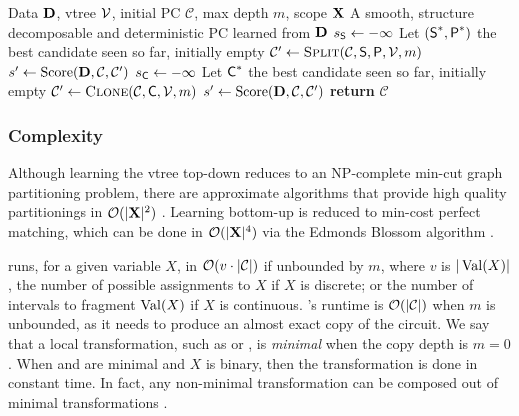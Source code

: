 \begin{algorithm}[t]
  \caption{}\label{alg:learnpsdd}
  \begin{algorithmic}[1]
    \Require Data $\mathbf{D}$, vtree $\operatorname{\mathcal{V}}$, initial PC $\mathcal{C}$, max depth $m$, scope $\mathbf{X}$
    \Ensure A smooth, structure decomposable and deterministic PC learned from $\mathbf{D}$
      \State $s_{\operatorname{\textsf{S}}}\gets -\infty$
      \State Let $(\operatorname{\textsf{S}}^\ast,\operatorname{\textsf{P}}^\ast)$ the best  candidate seen so far, initially empty
        \State $\mathcal{C}'\gets\textproc{Split}(\mathcal{C},\Sum,\Prod,\vtree,m)$
        \State $s'\gets\operatorname{\normalfont{Score}}(\mathbf{D},\mathcal{C},\mathcal{C}')$
      \EndFor
      \State $s_{\operatorname{\textsf{C}}}\gets -\infty$
      \State Let $\operatorname{\textsf{C}}^\ast$ the best  candidate seen so far, initially empty
        \State $\mathcal{C}'\gets\textproc{Clone}(\mathcal{C},\Child,\vtree,m)$
        \State $s'\gets\operatorname{\normalfont{Score}}(\mathbf{D},\mathcal{C},\mathcal{C}')$
      \EndFor
    \EndWhile
    \State \textbf{return} $\mathcal{C}$
  \end{algorithmic}
\end{algorithm}

\subsubsection{Complexity}

Although learning the vtree top-down reduces to an NP-complete min-cut graph partitioning problem,
there are approximate algorithms that provide high quality partitionings in $\mathcal{O}(|\mathbf{X}|^2)$
\citep{karypsis98}. Learning bottom-up is reduced to min-cost perfect matching, which can be done
in $\mathcal{O}(|\mathbf{X}|^4)$ via the Edmonds Blossom algorithm \citep{edmonds65,kolmogorov09}.

 runs, for a given variable $X$, in $\mathcal{O}(v\cdot|\mathcal{C}|)$ if unbounded
by $m$, where $v$ is $|\operatorname*{\normalfont{Val}}(X)|$, the number of possible assignments to $X$ if $X$ is discrete; or
the number of intervals to fragment $\operatorname*{\normalfont{Val}}(X)$ if $X$ is continuous. 's runtime is
$\mathcal{O}(|\mathcal{C}|)$ when $m$ is unbounded, as it needs to produce an almost exact copy of
the circuit. We say that a local transformation, such as  or , is
\emph{minimal} when the copy depth is $m=0$. When  and  are minimal
and $X$ is binary, then the transformation is done in constant time. In fact, any non-minimal
transformation can be composed out of minimal transformations \citep{liang17}.


